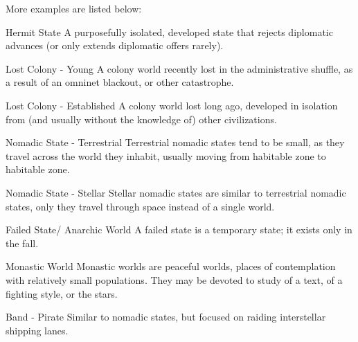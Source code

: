                                                                                                            


More examples are listed below:
 

             Hermit State                         A purposefully isolated, developed state that rejects  
                                                  diplomatic advances (or only extends diplomatic  
                                                  offers rarely).  

             Lost Colony - Young                  A colony world recently lost in the administrative  
                                                  shuffle, as a result of an omninet blackout, or other  
                                                  catastrophe.  

             Lost Colony - Established            A colony world lost long ago, developed in isolation  
                                                  from (and usually without the knowledge of) other  
                                                  civilizations.  

             Nomadic State - Terrestrial          Terrestrial nomadic states tend to be small, as they  
                                                  travel across the world they inhabit, usually moving  
                                                  from habitable zone to habitable zone.  

             Nomadic State - Stellar              Stellar nomadic states are similar to terrestrial  
                                                  nomadic states, only they travel through space  
                                                  instead of a single world.  

             Failed State/ Anarchic World         A failed state is a temporary state; it exists only in the  
                                                  fall.  

             Monastic World                       Monastic worlds are peaceful worlds, places of  
                                                  contemplation with relatively small populations. They  
                                                  may be devoted to study of a text, of a fighting style,  
                                                  or the stars.  

             Band - Pirate                        Similar to nomadic states, but focused on raiding  
                                                  interstellar shipping lanes.  

